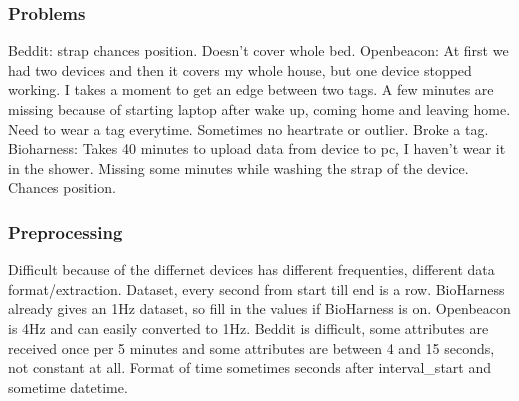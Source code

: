 		\subsubsection{Problems}
			Beddit: strap chances position. Doesn't cover whole bed. 
			Openbeacon: At first we had two devices and then it covers my whole house, but one device stopped working. I takes a moment to get an edge between two tags. A few minutes are missing because of starting laptop after wake up, coming home and leaving home. Need to wear a tag everytime. Sometimes no heartrate or outlier. Broke a tag.
			Bioharness: Takes 40 minutes to upload data from device to pc, I haven't wear it in the shower. Missing some minutes while washing the strap of the device. Chances position. 
		\subsubsection{Preprocessing}
			Difficult because of the differnet devices has different frequenties, different data format/extraction. 
			Dataset, every second from start till end is a row. BioHarness already gives an 1Hz dataset, so fill in the values if BioHarness is on. 
			Openbeacon is 4Hz and can easily converted to 1Hz.
			Beddit is difficult, some attributes are received once per 5 minutes and some attributes are between 4 and 15 seconds, not constant at all. Format of time sometimes seconds after interval\_start and sometime datetime.
		
